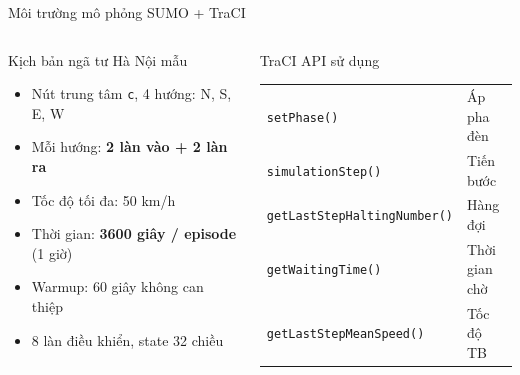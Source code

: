 \begin{frame}{Môi trường mô phỏng SUMO + TraCI}
  \begin{columns}[T]
    \begin{block}{Kịch bản ngã tư Hà Nội mẫu}
      \begin{itemize}
        \item Nút trung tâm \texttt{c}, 4 hướng: N, S, E, W
        \item Mỗi hướng: \textbf{2 làn vào + 2 làn ra}
        \item Tốc độ tối đa: 50 km/h
        \item Thời gian: \textbf{3600 giây / episode} (1 giờ)
        \item Warmup: 60 giây không can thiệp
        \item[$\Rightarrow$] 8 làn điều khiển, state 32 chiều
      \end{itemize}
    \end{block}
    \vspace{6pt}
    \begin{block}{TraCI API sử dụng}
      \begin{tabular}{@{}ll}
        \texttt{setPhase()} & Áp pha đèn\\
        \texttt{simulationStep()} & Tiến bước\\
        \texttt{getLastStepHaltingNumber()} & Hàng đợi\\
        \texttt{getWaitingTime()} & Thời gian chờ\\
        \texttt{getLastStepMeanSpeed()} & Tốc độ TB\\
      \end{tabular}
    \end{block}


\end{columns}
\end{frame}
